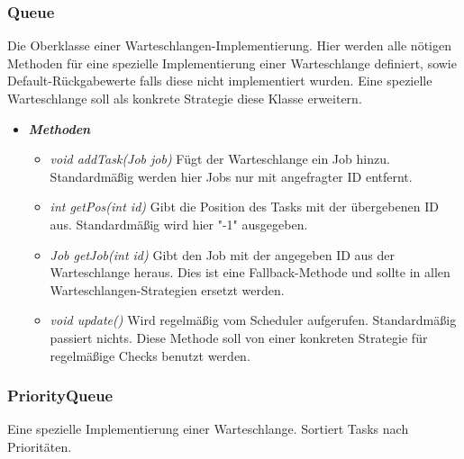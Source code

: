 \documentclass[a4paper,12pt]{article}
\begin{document}
\subsubsection{Queue}

Die Oberklasse einer Warteschlangen-Implementierung. Hier werden alle nötigen Methoden für eine spezielle Implementierung einer Warteschlange definiert, sowie Default-Rückgabewerte falls diese nicht implementiert wurden. Eine spezielle Warteschlange soll als konkrete Strategie diese Klasse erweitern.

\begin{itemize}[label={}]

\item \textit{\textbf{Methoden}}
\begin{itemize}[label={\textbullet}]
	
	\item \textit{void addTask(Job job)} Fügt der Warteschlange ein Job hinzu. Standardmäßig werden hier Jobs nur mit angefragter ID entfernt.

\item \textit{int getPos(int id)} Gibt die Position des Tasks mit der übergebenen ID aus. Standardmäßig wird hier "-1" ausgegeben.

\item \textit{Job getJob(int id)} Gibt den Job mit der angegeben ID aus der Warteschlange heraus. Dies ist eine Fallback-Methode und sollte in allen Warteschlangen-Strategien ersetzt werden. 

\item \textit{void update()} Wird regelmäßig vom Scheduler aufgerufen. Standardmäßig passiert nichts. Diese Methode soll von einer konkreten Strategie für regelmäßige Checks benutzt werden.

\end{itemize}

\end{itemize}

\clearpage
\subsubsection{PriorityQueue}

Eine spezielle Implementierung einer Warteschlange. Sortiert Tasks nach Prioritäten.
\end{document}

